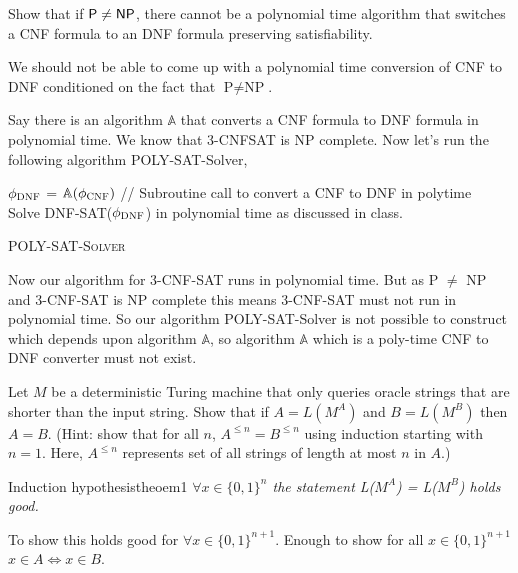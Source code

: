 \documentclass[12pt,a4, onecolumn]{exam}
\newcommand{\NP}{\ensuremath{\mathsf{NP}}}
\begin{document}
\begin{questions}
    \question Show that if ${\sf P} \ne \NP$, there cannot be a polynomial time algorithm that switches a {\sc CNF} formula to an {\sc DNF} formula preserving satisfiability.
  
    \begin{solution}
        We should not be able to come up with a polynomial time conversion of \textsc{CNF} to \textsc{DNF} conditioned on the fact that $\text{P} \neq \text{NP}$. 

        Say there is an algorithm $\mathbb{A}$ that converts a CNF formula to DNF formula in polynomial time. We know that 3-CNFSAT is NP complete. Now let's run the following algorithm POLY-SAT-Solver,

        \newpage
        \begin{algorithm}[H]
            
            \BlankLine
            $\phi_{\textsc{DNF}}$ = $\mathbb{A}(\phi_{\textsc{CNF}})$   // Subroutine call to convert a CNF to DNF in polytime\\
            Solve DNF-SAT($\phi_{\textsc{DNF}}$) in polynomial time as discussed in class.\\
            \caption{\textsc{POLY-SAT-Solver}}
        \end{algorithm}

        Now our algorithm for 3-CNF-SAT runs in polynomial time. But as P $\neq$ NP and 3-CNF-SAT is NP complete this means 3-CNF-SAT must not run in polynomial time. So our algorithm {\sc POLY-SAT-Solver} is not possible to construct which depends upon algorithm $\mathbb{A}$, so algorithm $\mathbb{A}$ which is a poly-time CNF to DNF converter must not exist.
    \end{solution}

    \question Let $M$ be a deterministic Turing machine that only queries oracle strings that are shorter than the input string. Show that if $A = L(M^A)$ and $B = L(M^B)$ then $A = B$. (Hint: show that for all $n$, $A^{\le n} = B^{\le n}$ using induction starting with $n=1$. Here, $A^{\le n}$ represents set of all  strings of  length at most $n$ in $A$.)
    \newpage
    \begin{solution}
        \begin{hypothesis}{Induction hypothesis}{theoem1}
          \textit{$\forall x \in \{0, 1\}^{n}$ the statement L($M^{A}$) = L($M^{B}$) holds good.}
        \end{hypothesis}
        To show this holds good for $\forall x \in \{0, 1\}^{n + 1}$. Enough to show for all $x \in \{0, 1\}^{n + 1}$ $x \in A \iff x \in B$.


\end{solution}
\end{questions}
\end{document}
